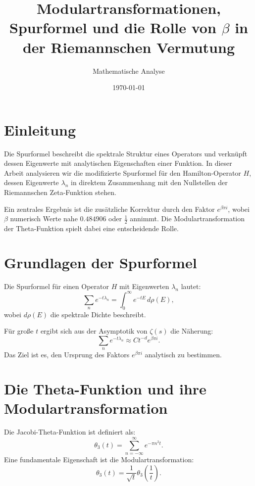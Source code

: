 \documentclass[a4paper,12pt]{article}
\title{Modulartransformationen, Spurformel und die Rolle von \( \beta \) in der Riemannschen Vermutung}
\author{Mathematische Analyse}
\date{\today}
\begin{document}
\maketitle

\section{Einleitung}
Die Spurformel beschreibt die spektrale Struktur eines Operators und verknüpft dessen Eigenwerte mit analytischen Eigenschaften einer Funktion. In dieser Arbeit analysieren wir die modifizierte Spurformel für den Hamilton-Operator \( H \), dessen Eigenwerte \( \lambda_n \) in direktem Zusammenhang mit den Nullstellen der Riemannschen Zeta-Funktion stehen.

Ein zentrales Ergebnis ist die zusätzliche Korrektur durch den Faktor \( e^{\beta \pi i} \), wobei \( \beta \) numerisch Werte nahe \( 0.484906 \) oder \( \frac{1}{2} \) annimmt. Die Modulartransformation der Theta-Funktion spielt dabei eine entscheidende Rolle.

\section{Grundlagen der Spurformel}
Die Spurformel für einen Operator \( H \) mit Eigenwerten \( \lambda_n \) lautet:
\begin{equation}
    \sum_n e^{-t \lambda_n} = \int_0^\infty e^{-t E} \, d\rho(E),
\end{equation}
wobei \( d\rho(E) \) die spektrale Dichte beschreibt.

Für große \( t \) ergibt sich aus der Asymptotik von \( \zeta(s) \) die Näherung:
\begin{equation}
    \sum_n e^{-t \lambda_n} \approx C t^{-d} e^{\beta \pi i}.
\end{equation}
Das Ziel ist es, den Ursprung des Faktors \( e^{\beta \pi i} \) analytisch zu bestimmen.

\section{Die Theta-Funktion und ihre Modulartransformation}
Die Jacobi-Theta-Funktion ist definiert als:
\begin{equation}
    \theta_3 (t) = \sum_{n=-\infty}^{\infty} e^{- \pi n^2 t}.
\end{equation}
Eine fundamentale Eigenschaft ist die Modulartransformation:
\begin{equation}
    \theta_3 (t) = \frac{1}{\sqrt{t}} \theta_3\left(\frac{1}{t}\right).
\end{equation}
\end{document}
